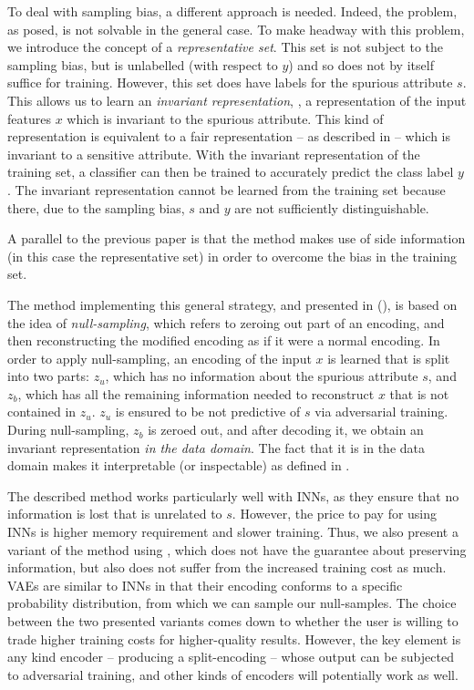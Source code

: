 To deal with sampling bias, a different approach is needed.
Indeed, the problem, as posed, is not solvable in the general case.
To make headway with this problem, we introduce the concept of a \emph{representative set}.
This set is not subject to the sampling bias,
but is unlabelled (with respect to $y$) and so does not by itself suffice for training.
However, this set does have labels for the spurious attribute \(s\).
This allows us to learn an \emph{invariant representation},
\ie, a representation of the input features \(x\) which is invariant to the spurious attribute.
This kind of representation is equivalent to a fair representation -- as described in  --
which is invariant to a sensitive attribute.
With the invariant representation of the training set,
a classifier can then be trained to accurately predict the class label \(y\).
The invariant representation cannot be learned from the training set
because there, due to the sampling bias, \(s\) and \(y\) are not sufficiently distinguishable.

A parallel to the previous paper is that the method makes use of side information
(in this case the representative set)
in order to overcome the bias in the training set.

The method implementing this general strategy, and presented in \citet{kehrenberg2020nullsampling} (),
is based on the idea of \emph{null-sampling},
which refers to zeroing out part of an encoding,
and then reconstructing the modified encoding as if it were a normal encoding.
In order to apply null-sampling, an encoding of the input \(x\) is learned that is split into two parts:
\(z_u\), which has no information about the spurious attribute \(s\),
and \(z_b\), which has all the remaining information needed to reconstruct \(x\) that is not contained in \(z_u\).
\(z_u\) is ensured to be not predictive of \(s\) via adversarial training.
During null-sampling, \(z_b\) is zeroed out, and after decoding it,
we obtain an invariant representation \emph{in the data domain}.
The fact that it is in the data domain makes it interpretable (or inspectable)
as defined in .

The described method works particularly well with \acp{INN},
as they ensure that no information is lost that is unrelated to \(s\).
However, the price to pay for using \acp{INN} is higher memory requirement and slower training.
Thus, we also present a variant of the method using ,
which does not have the guarantee about preserving information,
but also does not suffer from the increased training cost as much.
\acp{VAE} are similar to \acp{INN}
in that their encoding conforms to a specific probability distribution,
from which we can sample our null-samples.
The choice between the two presented variants comes down
to whether the user is willing to trade higher training costs for higher-quality results.
However, the key element is any kind encoder -- producing a split-encoding --
whose output can be subjected to adversarial training,
and other kinds of encoders will potentially work as well.

